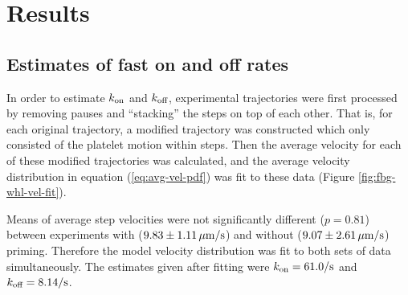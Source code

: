 \documentclass{biophys-new}
\newcommand{\tn}{\textnormal}
\begin{document}

\section*{Results}

\subsection*{Estimates of fast on and off rates}

In order to estimate $k_\textnormal{on}$ and $k_\textnormal{off}$, experimental
trajectories were first processed by removing pauses and ``stacking''
the steps on top of each other. That is, for each original trajectory,
a modified trajectory was constructed which only consisted of the
platelet motion within steps. Then the average velocity for each of
these modified trajectories was calculated, and the average velocity
distribution in equation (\ref{eq:avg-vel-pdf}) was fit to these data
(Figure \ref{fig:fbg-whl-vel-fit}).

Means of average step velocities were not significantly different
($p = 0.81$) between experiments with ($9.83 \pm 1.11 \, \mu
\tn{m}/\tn{s}$) and without ($9.07 \pm 2.61 \, \mu \tn{m}/\tn{s}$)
priming. Therefore the model velocity distribution was fit to both
sets of data simultaneously. The estimates given after fitting were
$\jvOnFast = 61.0 / \tn{s}$ and $\jvOffFast = 8.14 / \tn{s}$.
\end{document}
